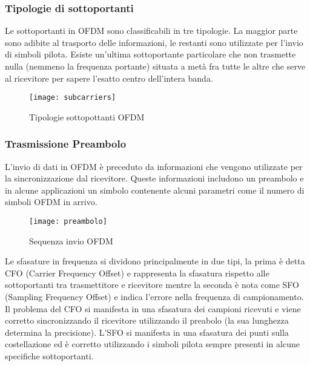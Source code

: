 \begin{itemize}
 
 \subsubsection{Tipologie di sottoportanti}
 Le sottoportanti in OFDM sono classificabili in tre tipologie. La maggior parte sono adibite al trasporto delle informazioni, le restanti sono utilizzate per l'invio di simboli pilota. Esiste un'ultima sottoportante particolare che non trasmette nulla (nemmeno la frequenza portante) situata a metà fra tutte le altre che serve al ricevitore per sapere l'esatto centro dell'intera banda.
 \begin{figure}[h]
 	\centering
 	\texttt{[image: subcarriers]}
 	\caption{Tipologie sottopottanti OFDM \cite{subcarriers}}\label{fig:1}
 \end{figure}
  \subsubsection{Trasmissione Preambolo}
	L'invio di dati in OFDM è preceduto da informazioni che vengono utilizzate per la sincronizzazione dal ricevitore. Queste informazioni includono un preambolo e in alcune applicazioni un simbolo contenente alcuni parametri come il numero di simboli OFDM in arrivo.
	\begin{figure}[h!]
		\centering
		\texttt{[image: preambolo]}
		\caption{Sequenza invio OFDM \cite{subcarriers}}\label{fig:1}
	\end{figure}
 
  Le sfasature in frequenza si dividono principalmente in due tipi, la prima è detta CFO (Carrier Frequency Offset) e rappresenta la sfasatura rispetto alle sottoportanti tra trasmettitore e ricevitore mentre la seconda è nota come SFO (Sampling Frequency Offset) e indica l'errore nella frequenza di campionamento. Il problema del CFO si manifesta in una sfasatura dei campioni ricevuti e viene corretto sincronizzando il ricevitore utilizzando il preabolo (la sua lunghezza determina la precisione). L'SFO si manifesta in una sfasatura dei punti sulla costellazione ed è corretto utilizzando i simboli pilota sempre presenti in alcune specifiche sottoportanti. \cite{FOOFDM}


\end{itemize}
